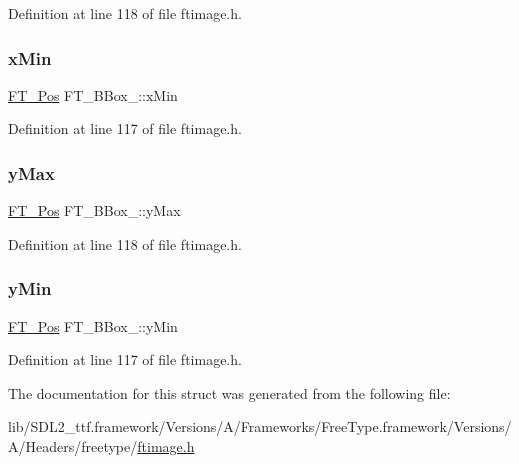 Definition at line 118 of file ftimage.\+h.

\mbox{\label{struct_f_t___b_box___a1f2a5d0565d496c1d41e43d018f45add}} 
\subsubsection{\texorpdfstring{xMin}{xMin}}
{\footnotesize\ttfamily \mbox{\hyperlink{ftimage_8h_af5f230f4b253d4c7715fd2e595614c90}{F\+T\+\_\+\+Pos}} F\+T\+\_\+\+B\+Box\+\_\+\+::x\+Min}



Definition at line 117 of file ftimage.\+h.

\mbox{\label{struct_f_t___b_box___a77084921589f386a8a593ae1f25b1569}} 
\subsubsection{\texorpdfstring{yMax}{yMax}}
{\footnotesize\ttfamily \mbox{\hyperlink{ftimage_8h_af5f230f4b253d4c7715fd2e595614c90}{F\+T\+\_\+\+Pos}} F\+T\+\_\+\+B\+Box\+\_\+\+::y\+Max}



Definition at line 118 of file ftimage.\+h.

\mbox{\label{struct_f_t___b_box___a959ca1d5bc1c5338da0d85c8e7135f4e}} 
\subsubsection{\texorpdfstring{yMin}{yMin}}
{\footnotesize\ttfamily \mbox{\hyperlink{ftimage_8h_af5f230f4b253d4c7715fd2e595614c90}{F\+T\+\_\+\+Pos}} F\+T\+\_\+\+B\+Box\+\_\+\+::y\+Min}



Definition at line 117 of file ftimage.\+h.



The documentation for this struct was generated from the following file\+:\begin{DoxyCompactItemize}
\item 
lib/\+S\+D\+L2\+\_\+ttf.\+framework/\+Versions/\+A/\+Frameworks/\+Free\+Type.\+framework/\+Versions/\+A/\+Headers/freetype/\mbox{\hyperlink{ftimage_8h}{ftimage.\+h}}\end{DoxyCompactItemize}
